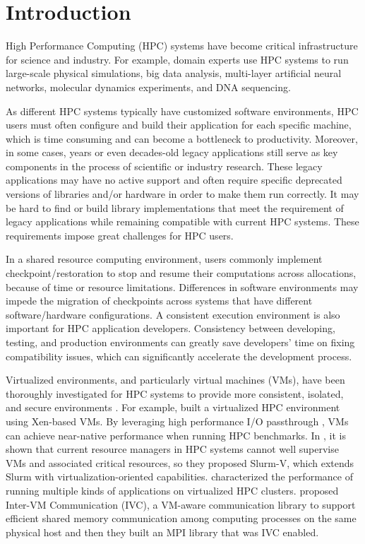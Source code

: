 \section{Introduction}
  \label{sec:introduction}

High Performance Computing (HPC) systems have become critical infrastructure for science and industry. For example, domain experts use HPC systems to run large-scale physical simulations, big data analysis, multi-layer artificial neural networks, molecular dynamics experiments, and DNA sequencing.

As different HPC systems typically have customized software environments, HPC users must often configure and build their application for each specific machine, which is time consuming and can become a bottleneck to productivity. Moreover, in some cases, years or even decades-old legacy applications still serve as key components in the process of scientific or industry research.  These legacy applications may have no active support and often require specific deprecated versions of libraries and/or hardware in order to make them run correctly. It may be hard to find or build library implementations that meet the requirement of legacy applications while remaining compatible with current HPC systems. These requirements impose great challenges for HPC users.  

In a shared resource computing environment, users commonly implement checkpoint/restoration to stop and resume their computations across allocations, because of time or resource limitations. Differences in software environments may impede the migration of checkpoints across systems that have different software/hardware configurations. A consistent execution environment is also important for HPC application developers. Consistency between developing, testing, and production environments can greatly save developers' time on fixing compatibility issues, which can significantly accelerate the development process.

Virtualized environments, and particularly virtual machines (VMs), have been thoroughly investigated for HPC systems to provide more consistent, isolated, and secure environments \cite{vallee2008system, reuther2012hpc}. For example, \cite{huang2006case} built a virtualized HPC environment using Xen-based VMs. By leveraging high performance I/O passthrough \cite{liu2006high}, VMs can achieve near-native performance when running HPC benchmarks. In \cite{zhang2016slurm}, it is shown that current resource managers in HPC systems cannot well supervise VMs and associated critical resources, so they proposed Slurm-V, which extends Slurm with virtualization-oriented capabilities. \cite{gugnani2016performance, tikotekar2008analysis} characterized the performance  of running multiple kinds of applications on virtualized HPC clusters. \cite{huang2007virtual} proposed Inter-VM Communication (IVC), a VM-aware communication library to support efficient shared memory communication among computing processes on the same physical host and then they built an MPI library that was IVC enabled.

